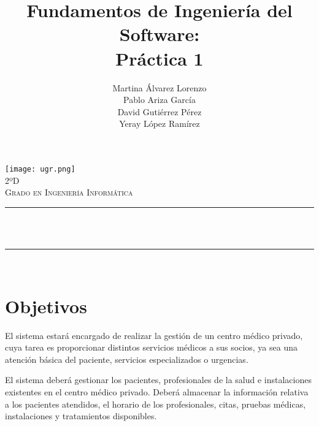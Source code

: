 \documentclass[12pt, spanish]{article}
\title{Fundamentos de Ingeniería del Software:\\
Práctica 1  \hspace{0.05cm} }
\date{}
\author{
\begin{center}
Martina Álvarez Lorenzo  \\
Pablo Ariza García  \\
David Gutiérrez Pérez  \\
Yeray López Ramírez \\
\end{center}
}
\makeatletter
\let\thetitle\@title
\let\theauthor\@author
\makeatother
\begin{document}

\begin{titlepage}
  \centering
  \vspace*{0.5 cm}
  \texttt{[image: ugr.png]}\\[1.0 cm]
  \textsc{\large 2ºD}\\[0.5 cm]
  \textsc{\large Grado en Ingeniería Informática}\\[0.5 cm]              
  \rule{\linewidth}{0.2 mm} \\[0.4 cm]
  { \huge \bfseries \thetitle}\\
  \rule{\linewidth}{0.2 mm} \\[1.5 cm]
  
      
  \theauthor

  \vfill
  
\end{titlepage}

\newpage



\tableofcontents
\pagebreak


\section{Objetivos}

El sistema estará encargado de realizar la gestión de un centro médico privado, cuya tarea es proporcionar distintos servicios médicos a sus socios, ya sea una atención básica del paciente, servicios especializados o urgencias.

El sistema deberá gestionar los pacientes, profesionales de la salud e instalaciones existentes en el centro médico privado. Deberá almacenar la información relativa a los pacientes atendidos, el horario de los profesionales, citas, pruebas médicas, instalaciones y tratamientos disponibles.
\end{document}
